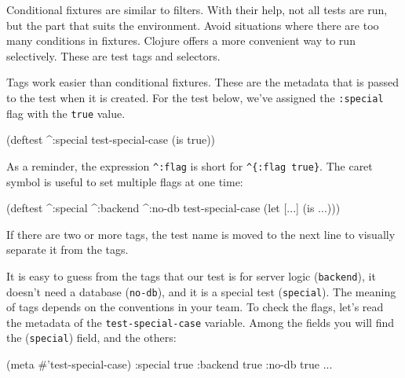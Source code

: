 
Conditional fixtures are similar to filters. With their help, not all tests are run, but the part that suits the environment. Avoid situations where there are too many conditions in fixtures. Clojure offers a more convenient way to run selectively. These are test tags and selectors.

Tags work easier than conditional fixtures. These are the metadata that is passed to the test when it is created. For the test below, we've assigned the \verb|:special| flag with the \verb|true| value.

\begin{english}
  \begin{clojure}
(deftest ^:special test-special-case
  (is true))
  \end{clojure}
\end{english}


As a reminder, the expression \verb|^:flag| is short for \verb|^{:flag true}|. The caret symbol is useful to set multiple flags at one time:

\begin{english}
  \begin{clojure}
(deftest ^:special ^:backend ^:no-db
  test-special-case
  (let [...]
    (is ...)))
  \end{clojure}
\end{english}

\noindent
If there are two or more tags, the test name is moved to the next line to visually separate it from the tags.

It is easy to guess from the tags that our test is for server logic (\verb|backend|), it doesn't need a database (\verb|no-db|), and it is a special test (\verb|special|). The meaning of tags depends on the conventions in your team. To check the flags, let's read the metadata of the \verb|test-special-case| variable. Among the fields you will find the (\verb|special|) field, and the others:

\ifnarrow

\begin{english}
  \begin{clojure}
(meta #'test-special-case)
{:special true
 :backend true
 :no-db true ...}
  \end{clojure}
\end{english}

\else

